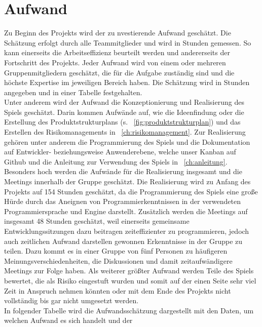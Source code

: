 \chapter{Aufwand}\label{ch:aufwand}
Zu Beginn des Projekts wird der zu nvestierende Aufwand geschätzt.
Die Schätzung erfolgt durch alle Teammitglieder und wird in Stunden gemessen.
So kann einerseits die Arbeitseffizienz beurteilt werden und andererseits der Fortschritt des Projekts.
Jeder Aufwand wird von einem oder mehreren Gruppenmitgliedern geschätzt, die für die Aufgabe zuständig sind und 
die höchste Expertise im jeweiligen Bereich haben. 
Die Schätzung wird in Stunden angegeben und in einer Tabelle festgehalten.\\
\newline
Unter anderem wird der Aufwand die Konzeptionierung und Realisierung des Spiels geschätzt.
Darin kommen Aufwände auf, wie die Ideenfindung oder die Erstellung des Produktstrukturplans 
(s. ~\autoref{fig:produktstrukturplan}) und das Erstellen des Risikomanagements in ~\autoref{ch:risikomanagement}.
Zur Realisierung gehören unter anderem die Programmierung des Spiels und die Dokumentation auf Entwickler-
beziehungsweise Anwenderebene, welche unser Kanban auf Github und die Anleitung zur Verwendung des Spiels in ~\autoref{ch:anleitung}.\\
\newline
Besonders hoch werden die Aufwände für die Realisierung insgesamt und die Meetings innerhalb der Gruppe geschätzt.
Die Realisierung wird zu Anfang des Projekts auf 154 Stunden geschätzt, da die Programmierung des Spiels eine große Hürde
durch das Aneignen von Programmierkenntnissen in der verwendeten Programmiersprache und Engine darstellt.
Zusätzlich werden die Meetings auf insgesamt 48 Stunden geschätzt, weil einerseits gemeinsame Entwicklungssitzungen dazu
beitragen zeiteffizienter zu programmieren, jedoch auch zeitlichen Aufwand darstellen gewonnen Erkenntnisse in der
Gruppe zu teilen.
Dazu kommt es in einer Gruppe von fünf Personen zu häufigeren Meinungsverschiedenheiten, die Diskussionen und damit
zeitaufwändigere Meetings zur Folge haben.
Als weiterer größter Aufwand werden Teile des Spiels bewertet, die als Risiko eingestuft wurden und somit auf der einen 
Seite sehr viel Zeit in Anspruch nehmen könnten oder mit dem Ende des Projekts nicht vollständig bis gar nicht umgesetzt
werden. \\
\newline
In folgender Tabelle wird die Aufwandsschätzung dargestellt mit den Daten, um welchen Aufwand es sich handelt und der
